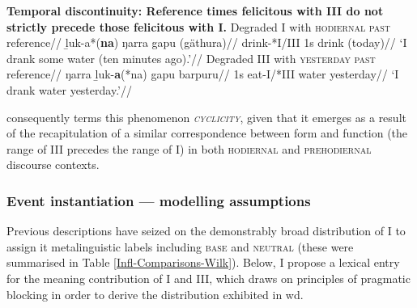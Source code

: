 \pex\textbf{ Temporal discontinuity: Reference times felicitous with \gls{III} do not strictly precede those felicitous with \gls{I}.}
\a\begingl\glpreamble Degraded \gls{I} with \textsc{hodiernal past} reference//
\gla ḻuk-a*(\textbf{na}) ŋarra gapu (gäthura)//
\glb drink-*\gls{I}/\gls{III} 1s drink (today)//
\glft`I drank some water (ten minutes ago).'//\endgl
\a\begingl\glpreamble Degraded \gls{III} with \textsc{yesterday past} reference//
\gla ŋarra ḻuk-\textbf{a}(*na) gapu barpuru//
\glb 1s eat-\gls{I}/*\gls{III} water yesterday//
\glft`I drank water yesterday.'\trailingcitation{[DhG~20190405]}//\endgl
\xe


\citet{Comrie1985} consequently terms this phenomenon \textit{\textsc{cyclicity}}, given that it emerges as a result of the recapitulation of a similar correspondence between form and function (the range of \gls{III} precedes the range of \gls{I}) in both \textsc{hodiernal} and \textsc{prehodiernal} discourse contexts.


\subsubsection{Event instantiation --- modelling assumptions}%

Previous descriptions have seized on the demonstrably broad distribution of \gls{I} to assign it metalinguistic labels including \textsc{base} and \textsc{neutral} (these were summarised in Table \ref{Infl-Comparisons-Wilk}). Below, I propose a lexical entry for the meaning contribution of \gls{I} and \gls{III}, which draws on principles of pragmatic blocking in order to derive the distribution exhibited in \acrshort{wd}.



